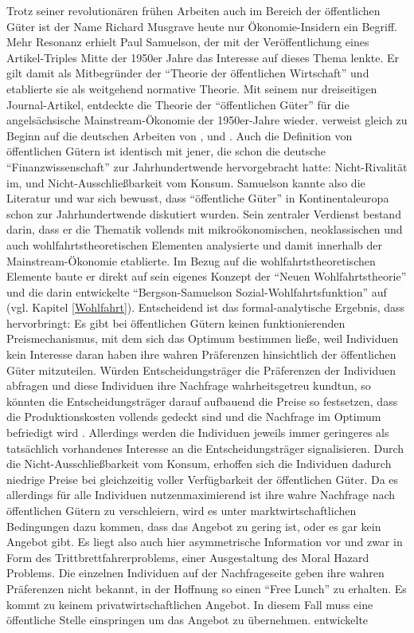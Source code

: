Trotz seiner revolutionären frühen Arbeiten auch im Bereich der öffentlichen Güter ist der Name Richard Musgrave heute nur Ökonomie-Insidern ein Begriff. Mehr Resonanz erhielt Paul Samuelson, der mit der Veröffentlichung eines Artikel-Triples \parencite{Samuelson1954, Samuelson1955, Samuelson1958} Mitte der 1950er Jahre das Interesse auf dieses Thema lenkte. Er gilt damit als Mitbegründer der "`Theorie der öffentlichen Wirtschaft"' und etablierte sie als weitgehend normative Theorie. Mit seinem nur dreiseitigen Journal-Artikel, entdeckte \textcite{Samuelson1954} die Theorie der "`öffentlichen Güter"' für die angelsächsische Mainstream-Ökonomie der 1950er-Jahre wieder.  \textcite[S. 387]{Samuelson1954} verweist gleich zu Beginn auf die deutschen Arbeiten von \textcite{Sax1887}, \textcite{Lindhal1928} und \textcite{Wicksell1896}. Auch die Definition von öffentlichen Gütern ist identisch mit jener, die schon die deutsche "`Finanzwissenschaft"' zur Jahrhundertwende hervorgebracht hatte: Nicht-Rivalität im, und Nicht-Ausschließbarkeit vom Konsum. Samuelson kannte also die Literatur und war sich bewusst, dass "`öffentliche Güter"' in Kontinentaleuropa schon zur Jahrhundertwende diskutiert wurden. Sein zentraler Verdienst bestand darin, dass er die Thematik vollends mit mikroökonomischen, neoklassischen und auch wohlfahrtstheoretischen Elementen analysierte und damit innerhalb der Mainstream-Ökonomie etablierte. Im Bezug auf die wohlfahrtstheoretischen Elemente baute er direkt auf sein eigenes Konzept der "`Neuen Wohlfahrtstheorie"' und die darin entwickelte "`Bergson-Samuelson Sozial-Wohlfahrtsfunktion"' auf (vgl. Kapitel \ref{Wohlfahrt}). Entscheidend ist das formal-analytische Ergebnis, dass \textcite{Samuelson1954} hervorbringt: Es gibt bei öffentlichen Gütern keinen funktionierenden Preismechanismus, mit dem sich das Optimum bestimmen ließe, weil Individuen kein Interesse daran haben ihre wahren Präferenzen hinsichtlich der öffentlichen Güter mitzuteilen. Würden Entscheidungsträger die Präferenzen der Individuen abfragen und diese Individuen ihre Nachfrage wahrheitsgetreu kundtun, so könnten die Entscheidungsträger darauf aufbauend die Preise so festsetzen, dass die Produktionskosten vollends gedeckt sind und die Nachfrage im Optimum befriedigt wird \parencite[S. 389]{Samuelson1954}. Allerdings werden die Individuen jeweils immer geringeres als tatsächlich vorhandenes Interesse an die Entscheidungsträger signalisieren. Durch die Nicht-Ausschließbarkeit vom Konsum, erhoffen sich die Individuen dadurch niedrige Preise bei gleichzeitig voller Verfügbarkeit der öffentlichen Güter. Da es allerdings für alle Individuen nutzenmaximierend ist ihre wahre Nachfrage nach öffentlichen Gütern zu verschleiern, wird es unter marktwirtschaftlichen Bedingungen dazu kommen, dass das Angebot zu gering ist, oder es gar kein Angebot gibt. Es liegt also auch hier asymmetrische Information vor und zwar in Form des Trittbrettfahrerproblems, einer Ausgestaltung des Moral Hazard Problems. Die einzelnen Individuen auf der Nachfrageseite geben ihre wahren Präferenzen nicht bekannt, in der Hoffnung so einen "`Free Lunch"' zu erhalten. Es kommt zu keinem privatwirtschaftlichen Angebot. In diesem Fall muss eine öffentliche Stelle einspringen um das Angebot zu übernehmen. \textcite{Musgrave1956} entwickelte 